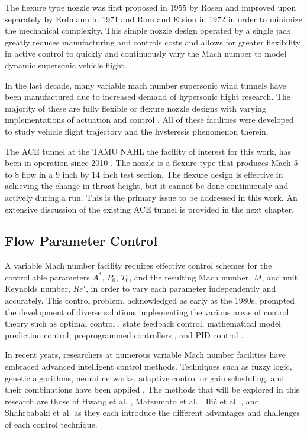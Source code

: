 The flexure type nozzle was first proposed in 1955 by Rosen \cite{rosen} and improved upon separately by Erdmann in 1971\cite{erdmann} and Rom and Etsion in 1972 \cite{rom} in order to minimize the mechanical complexity. This simple nozzle design operated by a single jack greatly reduces manufacturing and controls costs and allows for greater flexibility in active control to quickly and continuously vary the Mach number to model dynamic supersonic vehicle flight.

In the last decade, many variable mach number supersonic wind tunnels have been manufactured due to increased demand of hypersonic flight research. The majority of these are fully flexible or flexure nozzle designs with varying implementations of actuation and control \cite{ilic-1,shahrbabaki-1,durand,laguarda,chen,guo,lv,qi,steeves}. All of these facilities were developed to study vehicle flight trajectory and the hysteresis phenomenon therein.

The ACE tunnel at the TAMU NAHL the facility of interest for this work, has been in operation since 2010 \cite{ace09,ace10-calibrate,tichenor-dis}. The nozzle is a flexure type that produces Mach 5 to 8 flow in a 9 inch by 14 inch test section. The flexure design is effective in achieving the change in throat height, but it cannot be done continuously and actively during a run. This is the primary issue to be addressed in this work. An extensive discussion of the existing ACE tunnel is provided in the next chapter.

\subsection{Flow Parameter Control}
A variable Mach number facility requires effective control schemes for the controllable parameters $A^*$, $P_0$, $T_0$, and the resulting Mach number, $M$, and unit Reynolds number, $Re'$, in order to vary each parameter independently and accurately. This control problem, acknowledged as early as the 1980s, prompted the development of diverse solutions implementing the various areas of control theory such as optimal control \cite{kraft,hwang}, state feedback control, mathematical model prediction control, preprogrammed controllers \cite{matsumoto}, and PID control \cite{fung,ilic-2,silva}.

In recent years, researchers at numerous variable Mach number facilities have embraced advanced intelligent control methods. Techniques such as fuzzy logic, genetic algorithms, neural networks, adaptive control or gain scheduling, and their combinations have been applied \cite{nott,shahrbabaki-1}. The methods that will be explored in this research are those of Hwang et al. \cite{hwang}, Matsumoto et al. \cite{matsumoto}, Ili\'c et al. \cite{ilic-2}, and Shahrbabaki et al. \cite{shahrbabaki-1} as they each introduce the different advantages and challenges of each control technique. 

